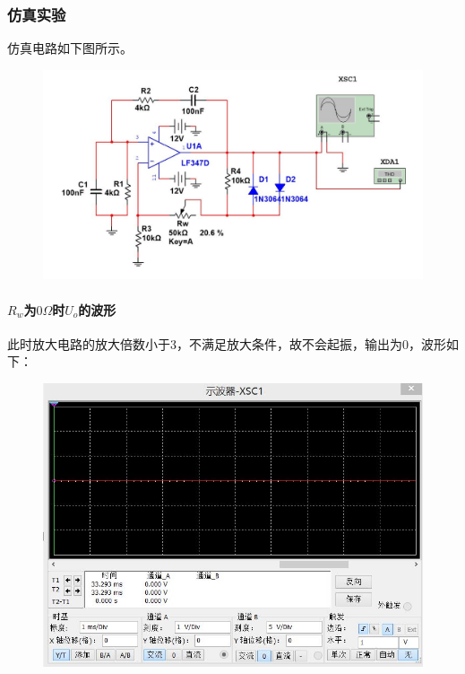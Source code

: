 \documentclass[12pt,a4paper]{article}
\begin{document}
\begin{spacing}{1.3}
\subsubsection{仿真实验}
仿真电路如下图所示。
\begin{figure}[H]
\centering
\includegraphics[width=\textwidth]{2.jpg}
\end{figure}
\paragraph{$R_w$为$0\Omega$时$U_o$的波形} 此时放大电路的放大倍数小于3，不满足放大条件，故不会起振，输出为0，波形如下：
\begin{figure}[H]
\centering
\includegraphics[width=\textwidth]{3.jpg}
\end{figure}

\end{spacing}
\end{document}
